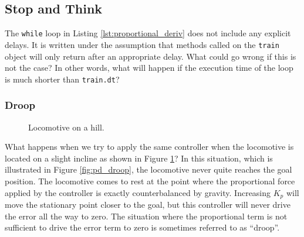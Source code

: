 \subsection*{Stop and Think}

\begin{exercise}
  The \verb+while+ loop in Listing \ref{lst:proportional_deriv} does
  not include any explicit delays.  It is written under the assumption
  that methods called on the \verb+train+ object will only return
  after an appropriate delay.  What could go wrong if this is not the
  case?  In other words, what will happen if the execution time of the
  loop is much shorter than \verb+train.dt+?
\end{exercise}



\subsubsection{Droop}


\begin{figure}
\begin{center}
\end{center}
\caption{Locomotive on a hill.}
\label{fig:train_hill}
\end{figure}

What happens when we try to apply the same controller when the
locomotive is located on a slight incline as shown in Figure
\ref{fig:train_hill}?  In this situation, which is illustrated in
Figure \ref{fig:pd_droop}, the locomotive never quite
reaches the goal position.  The locomotive comes to rest at the point
where the proportional force applied by the controller is exactly
counterbalanced by gravity.  Increasing $K_p$ will move the stationary
point closer to the goal, but this controller will never drive the
error all the way to zero.  The situation where the proportional term
is not sufficient to drive the error term to zero is sometimes
referred to as ``droop''. 


